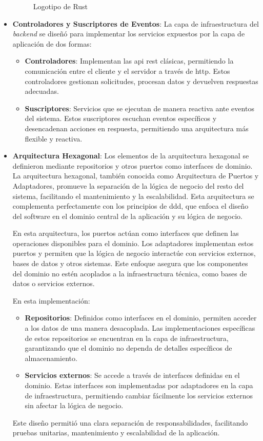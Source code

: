 \begin{itemize}
\begin{figure}[H]
        	\caption[Logotipo de Rust]{Logotipo de Rust}
            \label{fig:rust}
        \end{figure}
    \item \textbf{Controladores y Suscriptores de Eventos}: La capa de infraestructura del \textit{backend} se diseñó para implementar los servicios expuestos por la capa de aplicación de dos formas:
    \begin{itemize}
        \item \textbf{Controladores}: Implementan las \ac{api} \ac{rest} clásicas, permitiendo la comunicación entre el cliente y el servidor a través de \ac{http}. Estos controladores gestionan solicitudes, procesan datos y devuelven respuestas adecuadas.
        \item \textbf{Suscriptores}: Servicios que se ejecutan de manera reactiva ante eventos del sistema. Estos suscriptores escuchan eventos específicos y desencadenan acciones en respuesta, permitiendo una arquitectura más flexible y reactiva.
    \end{itemize}
    \item \textbf{Arquitectura Hexagonal}: Los elementos de la arquitectura hexagonal \cite{hexagonal_architecture} se definieron mediante repositorios y otros puertos como interfaces de dominio. La arquitectura hexagonal, también conocida como Arquitectura de Puertos y Adaptadores, promueve la separación de la lógica de negocio del resto del sistema, facilitando el mantenimiento y la escalabilidad. Esta arquitectura se complementa perfectamente con los principios de \ac{ddd}, que enfoca el diseño del software en el dominio central de la aplicación y su lógica de negocio.

    En esta arquitectura, los puertos actúan como interfaces que definen las operaciones disponibles para el dominio. Los adaptadores implementan estos puertos y permiten que la lógica de negocio interactúe con servicios externos, bases de datos y otros sistemas. Este enfoque asegura que los componentes del dominio no estén acoplados a la infraestructura técnica, como bases de datos o servicios externos.
    
    En esta implementación:
    \begin{itemize}
        \item \textbf{Repositorios}: Definidos como interfaces en el dominio, permiten acceder a los datos de una manera desacoplada. Las implementaciones específicas de estos repositorios se encuentran en la capa de infraestructura, garantizando que el dominio no dependa de detalles específicos de almacenamiento.
        \item \textbf{Servicios externos}: Se accede a través de interfaces definidas en el dominio. Estas interfaces son implementadas por adaptadores en la capa de infraestructura, permitiendo cambiar fácilmente los servicios externos sin afectar la lógica de negocio.
    \end{itemize}
    
    Este diseño permitió una clara separación de responsabilidades, facilitando pruebas unitarias, mantenimiento y escalabilidad de la aplicación.
\end{itemize}

